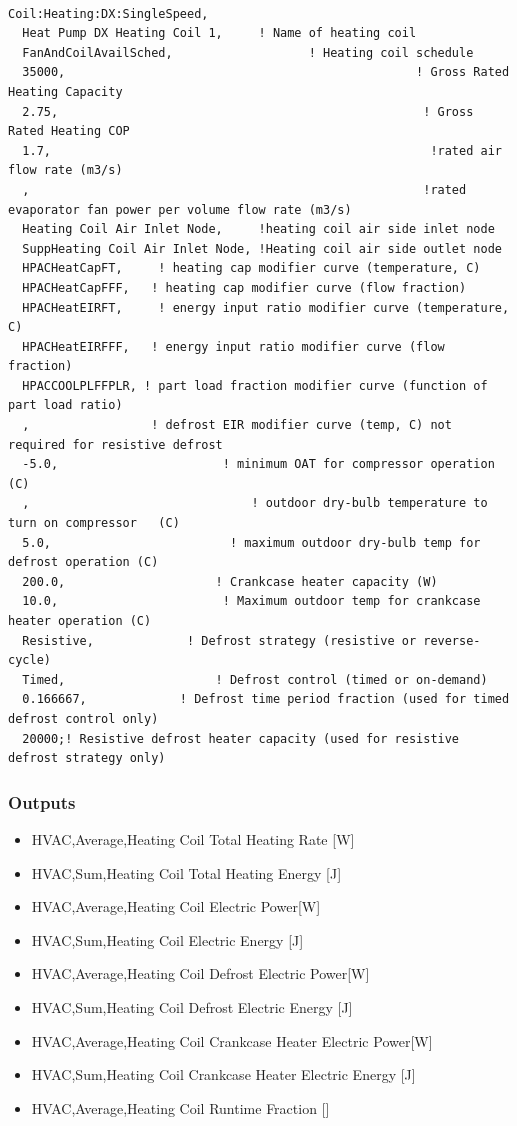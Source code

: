 \begin{lstlisting}

Coil:Heating:DX:SingleSpeed,
  Heat Pump DX Heating Coil 1,     ! Name of heating coil
  FanAndCoilAvailSched,                   ! Heating coil schedule
  35000,                                                 ! Gross Rated Heating Capacity
  2.75,                                                   ! Gross Rated Heating COP
  1.7,                                                     !rated air flow rate (m3/s)
  ,                                                       !rated evaporator fan power per volume flow rate (m3/s)
  Heating Coil Air Inlet Node,     !heating coil air side inlet node
  SuppHeating Coil Air Inlet Node, !Heating coil air side outlet node
  HPACHeatCapFT,     ! heating cap modifier curve (temperature, C)
  HPACHeatCapFFF,   ! heating cap modifier curve (flow fraction)
  HPACHeatEIRFT,     ! energy input ratio modifier curve (temperature, C)
  HPACHeatEIRFFF,   ! energy input ratio modifier curve (flow fraction)
  HPACCOOLPLFFPLR, ! part load fraction modifier curve (function of part load ratio)
  ,                 ! defrost EIR modifier curve (temp, C) not required for resistive defrost
  -5.0,                       ! minimum OAT for compressor operation   (C)
  ,                               ! outdoor dry-bulb temperature to turn on compressor   (C)
  5.0,                         ! maximum outdoor dry-bulb temp for defrost operation (C)
  200.0,                     ! Crankcase heater capacity (W)
  10.0,                       ! Maximum outdoor temp for crankcase heater operation (C)
  Resistive,             ! Defrost strategy (resistive or reverse-cycle)
  Timed,                     ! Defrost control (timed or on-demand)
  0.166667,             ! Defrost time period fraction (used for timed defrost control only)
  20000;! Resistive defrost heater capacity (used for resistive defrost strategy only)
\end{lstlisting}

\subsubsection{Outputs}\label{outputs-15-000}

\begin{itemize}
\item
  HVAC,Average,Heating Coil Total Heating Rate {[}W{]}
\item
  HVAC,Sum,Heating Coil Total Heating Energy {[}J{]}
\item
  HVAC,Average,Heating Coil Electric Power{[}W{]}
\item
  HVAC,Sum,Heating Coil Electric Energy {[}J{]}
\item
  HVAC,Average,Heating Coil Defrost Electric Power{[}W{]}
\item
  HVAC,Sum,Heating Coil Defrost Electric Energy {[}J{]}
\item
  HVAC,Average,Heating Coil Crankcase Heater Electric Power{[}W{]}
\item
  HVAC,Sum,Heating Coil Crankcase Heater Electric Energy {[}J{]}
\item
  HVAC,Average,Heating Coil Runtime Fraction {[]}
\end{itemize}

